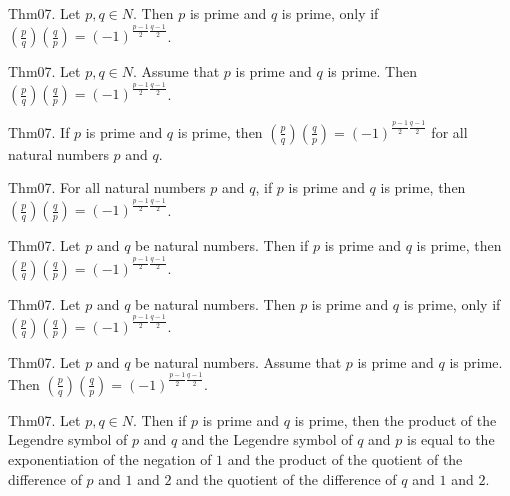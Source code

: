 \documentclass{article}
\begin{document}
Thm07. Let $p , q \in N$. Then $p$ is prime and $q$ is prime, only if $\left(\frac{ p }{ q }\right) \left(\frac{ q }{ p }\right) = (- 1)^ {\frac{ p - 1}{2}\frac{ q - 1}{2}}$.

Thm07. Let $p , q \in N$. Assume that $p$ is prime and $q$ is prime. Then $\left(\frac{ p }{ q }\right) \left(\frac{ q }{ p }\right) = (- 1)^ {\frac{ p - 1}{2}\frac{ q - 1}{2}}$.

Thm07. If $p$ is prime and $q$ is prime, then $\left(\frac{ p }{ q }\right) \left(\frac{ q }{ p }\right) = (- 1)^ {\frac{ p - 1}{2}\frac{ q - 1}{2}}$ for all natural numbers $p$ and $q$.

Thm07. For all natural numbers $p$ and $q$, if $p$ is prime and $q$ is prime, then $\left(\frac{ p }{ q }\right) \left(\frac{ q }{ p }\right) = (- 1)^ {\frac{ p - 1}{2}\frac{ q - 1}{2}}$.

Thm07. Let $p$ and $q$ be natural numbers. Then if $p$ is prime and $q$ is prime, then $\left(\frac{ p }{ q }\right) \left(\frac{ q }{ p }\right) = (- 1)^ {\frac{ p - 1}{2}\frac{ q - 1}{2}}$.

Thm07. Let $p$ and $q$ be natural numbers. Then $p$ is prime and $q$ is prime, only if $\left(\frac{ p }{ q }\right) \left(\frac{ q }{ p }\right) = (- 1)^ {\frac{ p - 1}{2}\frac{ q - 1}{2}}$.

Thm07. Let $p$ and $q$ be natural numbers. Assume that $p$ is prime and $q$ is prime. Then $\left(\frac{ p }{ q }\right) \left(\frac{ q }{ p }\right) = (- 1)^ {\frac{ p - 1}{2}\frac{ q - 1}{2}}$.

Thm07. Let $p , q \in N$. Then if $p$ is prime and $q$ is prime, then the product of the Legendre symbol of $p$ and $q$ and the Legendre symbol of $q$ and $p$ is equal to the exponentiation of the negation of $1$ and the product of the quotient of the difference of $p$ and $1$ and $2$ and the quotient of the difference of $q$ and $1$ and $2$.
\end{document}
